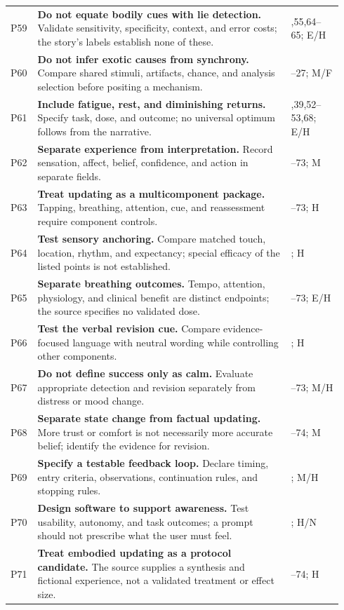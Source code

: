 \begin{longtable}{@{}>{\raggedright\arraybackslash}p{0.055\linewidth}>{\raggedright\arraybackslash}p{0.735\linewidth}>{\raggedright\arraybackslash}p{0.15\linewidth}@{}}
P59 & \textbf{Do not equate bodily cues with lie detection.} Validate sensitivity, specificity, context, and error costs; the story's labels establish none of these. & 31,55,64--65; E/H\\[0.5em]
P60 & \textbf{Do not infer exotic causes from synchrony.} Compare shared stimuli, artifacts, chance, and analysis selection before positing a mechanism. & 26--27; M/F\\[0.5em]
P61 & \textbf{Include fatigue, rest, and diminishing returns.} Specify task, dose, and outcome; no universal optimum follows from the narrative. & 18,39,52--53,68; E/H\\[0.5em]
P62 & \textbf{Separate experience from interpretation.} Record sensation, affect, belief, confidence, and action in separate fields. & 71--73; M\\[0.5em]
P63 & \textbf{Treat updating as a multicomponent package.} Tapping, breathing, attention, cue, and reassessment require component controls. & 71--73; H\\[0.5em]
P64 & \textbf{Test sensory anchoring.} Compare matched touch, location, rhythm, and expectancy; special efficacy of the listed points is not established. & 72; H\\[0.5em]
P65 & \textbf{Separate breathing outcomes.} Tempo, attention, physiology, and clinical benefit are distinct endpoints; the source specifies no validated dose. & 72--73; E/H\\[0.5em]
P66 & \textbf{Test the verbal revision cue.} Compare evidence-focused language with neutral wording while controlling other components. & 72; H\\[0.5em]
P67 & \textbf{Do not define success only as calm.} Evaluate appropriate detection and revision separately from distress or mood change. & 72--73; M/H\\[0.5em]
P68 & \textbf{Separate state change from factual updating.} More trust or comfort is not necessarily more accurate belief; identify the evidence for revision. & 72--74; M\\[0.5em]
P69 & \textbf{Specify a testable feedback loop.} Declare timing, entry criteria, observations, continuation rules, and stopping rules. & 73; M/H\\[0.5em]
P70 & \textbf{Design software to support awareness.} Test usability, autonomy, and task outcomes; a prompt should not prescribe what the user must feel. & 73; H/N\\[0.5em]
P71 & \textbf{Treat embodied updating as a protocol candidate.} The source supplies a synthesis and fictional experience, not a validated treatment or effect size. & 71--74; H\\[0.5em]

\end{longtable}
